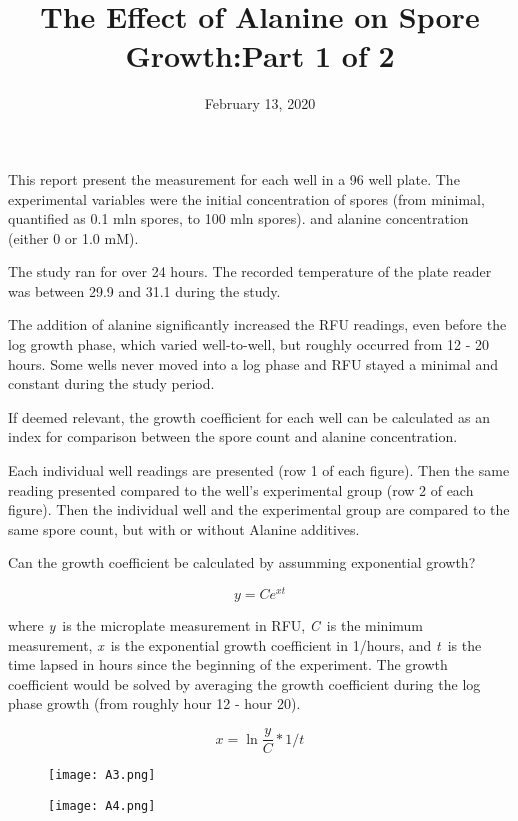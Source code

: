 \documentclass{article}
\title{The Effect of Alanine on Spore Growth:Part 1 of 2 }
\date{February 13, 2020}
\begin{document}
\maketitle
 
This report present the measurement for each well in a 96 well plate. The experimental variables were the initial concentration of spores (from minimal, quantified as 0.1 mln spores, to 100 mln spores). and alanine concentration (either 0 or 1.0 mM). 

The study ran for over 24 hours. The recorded temperature of the plate reader was between 29.9 and 31.1 during the study. 

The addition of alanine significantly increased the RFU readings, even before the log  growth phase, which varied well-to-well, but roughly occurred from 12 - 20 hours. Some wells never moved into a log phase and RFU stayed a minimal and constant during the study period. 

If deemed relevant, the growth coefficient for each well can be calculated as an index for comparison between the spore count and alanine concentration. 

Each individual well readings are presented (row 1 of each figure). Then the same reading presented compared to the well's experimental group (row 2 of each figure). Then the individual well and the experimental group are compared to the same spore count, but with or without Alanine additives. 

Can the growth coefficient be calculated by assumming exponential growth?

\[ y =C e^{xt}\]

where \textit{y}\  is the microplate measurement in RFU, \textit{C}\  is the minimum measurement, \textit{x}\  is the exponential growth coefficient in 1/hours, and \textit{t}\  is the time lapsed in hours since the beginning of the experiment. The growth coefficient would be solved by averaging the growth coefficient during the log phase growth (from roughly hour 12 - hour 20). 

\[x=  \ln{  \frac{y}{C} }  * 1/t\]



\begin{figure}[!hb]
\centering
\texttt{[image:  A3.png]}
\end{figure}

\begin{figure}[!hb]
\centering
\texttt{[image:  A4.png]}
\end{figure}
\end{document}
